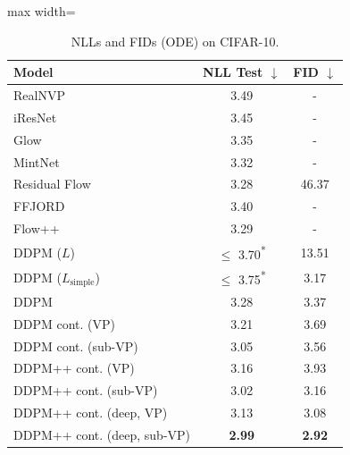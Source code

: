\begin{table}
\begin{minipage}[t]{0.48\textwidth}
\vspace{-0.3cm}
\begin{table}[H]
\centering
\caption{NLLs and FIDs (ODE) on CIFAR-10. }\label{tab:bpd}\vspace{-1em}
\footnotesize
 \setlength\tabcolsep{3.5pt}
\begin{adjustbox}{max width=\textwidth}
    \begin{tabular}{l c c}
    \toprule
    Model & NLL Test $\downarrow$ & FID $\downarrow$\\
    \midrule
    RealNVP~\citep{dinh2016density} & 3.49 & -\\
    iResNet~\citep{behrmann2019invertible} & 3.45 & -\\
    Glow~\citep{kingma2018glow} & 3.35 & - \\
    MintNet~\citep{song2019mintnet} & 3.32 & - \\
    Residual Flow~\citep{chen2019residual} & 3.28 & 46.37\\
    FFJORD~\citep{grathwohl2018ffjord} & 3.40 & -\\
    Flow++~\citep{ho2019flow++} & 3.29 & -\\
    DDPM ($L$)~\citep{ho2020denoising} & $\leq$ 3.70\textsuperscript{*} & 13.51\\
    DDPM ($L_{\text{simple}}$)~\citep{ho2020denoising} & $\leq$ 3.75\textsuperscript{*} & 3.17\\
    \midrule
    DDPM & 3.28 & 3.37\\\relax
    DDPM cont. (VP) & 3.21 & 3.69\\\relax
    DDPM cont. (sub-VP) & 3.05 & 3.56\\\relax
    DDPM++ cont. (VP) & 3.16 & 3.93\\\relax
    DDPM++ cont. (sub-VP) & 3.02 & 3.16\\ \relax
    DDPM++ cont. (deep, VP) & 3.13 & 3.08\\ \relax
    DDPM++ cont. (deep, sub-VP) & \textbf{2.99} & \textbf{2.92} \\
    \bottomrule
    \end{tabular}
\end{adjustbox}
\end{table}
\end{minipage}\hfil
\begin{minipage}[t]{0.48\textwidth}
\vspace{-0.3cm}
\begin{table}[H]

\end{table}
\end{minipage}
\end{table}
